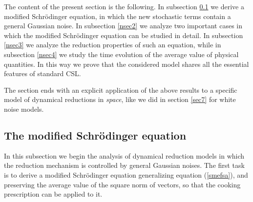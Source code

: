 \documentclass[12pt]{article}
\begin{document}
The content of the present section is the following. In subsection
\ref{nsec1} we derive a modified Schr\"odinger equation, in which
the new stochastic terms contain a general Gaussian noise. In
subsection \ref{nsec2} we analyze two important cases in which the
modified Schr\"odinger equation can be studied in detail. In
subsection \ref{nsec3} we analyze the reduction properties of such
an equation, while in subsection \ref{nsec4} we study the time
evolution of the average value of physical quantities. In this way
we prove that the considered model shares all the essential
features of standard CSL.

The section ends with an explicit application of the above results
to a specific model of dynamical reductions in {\it space}, like
we did in section \ref{sec7} for white noise models.

\subsection{The modified Schr\"odinger equation} \label{nsec1}

In this subsection we begin the analysis of dynamical reduction
models in which the reduction mechanism is controlled by general
Gaussian noises. The first task is to derive a modified
Schr\"odinger equation generalizing equation (\ref{smefsa}), and
preserving the average value of the square norm of vectors, so
that the cooking prescription can be applied to it.
\end{document}

